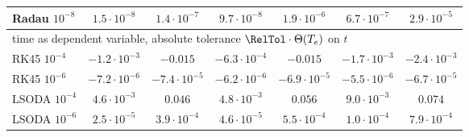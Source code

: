 \begin{tabular}{lcccccc}
Radau $10^{-8}$ & $1.5\cdot10^{-8}$ & $1.4\cdot10^{-7}$ & $9.7\cdot10^{-8}$ & $1.9\cdot10^{-6}$ & $6.7\cdot10^{-7}$ & $2.9\cdot10^{-5}$ \\
\midrule
\multicolumn{7}{l}{time as dependent variable, absolute tolerance $\RelTol\cdot\Theta(T_e)$ on $t$}\\
RK45 $10^{-4}$ & $-1.2\cdot10^{-3}$ & $-0.015$ & $-6.3\cdot10^{-4}$ & $-0.015$ & $-1.7\cdot10^{-3}$ & $-2.4\cdot10^{-3}$ \\
RK45 $10^{-6}$ & $-7.2\cdot10^{-6}$ & $-7.4\cdot10^{-5}$ & $-6.2\cdot10^{-6}$ & $-6.9\cdot10^{-5}$ & $-5.5\cdot10^{-6}$ & $-6.7\cdot10^{-5}$ \\
LSODA $10^{-4}$ & $4.6\cdot10^{-3}$ & $0.046$ & $4.8\cdot10^{-3}$ & $0.056$ & $9.0\cdot10^{-3}$ & $0.074$ \\
LSODA $10^{-6}$ & $2.5\cdot10^{-5}$ & $3.9\cdot10^{-4}$ & $4.6\cdot10^{-5}$ & $5.5\cdot10^{-4}$ & $1.0\cdot10^{-4}$ & $7.9\cdot10^{-4}$ \\
\bottomrule
\end{tabular}
